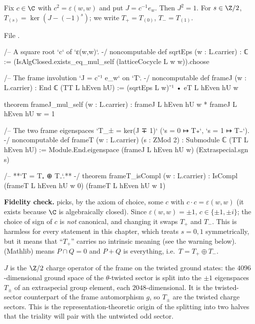 \begin{definition}\label{ch11:def:frameJ}
Fix $c\in\C$ with $c^2=\varepsilon(w,w)$ and put $J=c^{-1}e_w$.  Then $J^2=1$.  For $s\in\Z/2$,
$T_{(s)}=\ker(J-(-1)^s)$; we write $T_+=T_{(0)}$, $T_-=T_{(1)}$.
\end{definition}
\noindent File .
\begin{leancode}
/-- A square root `c` of `ε(w,w)`. -/
noncomputable def sqrtEps (w : L.carrier) : ℂ :=
  (IsAlgClosed.exists_eq_mul_self (latticeCocycle L w w)).choose

/-- The frame involution `J = c⁻¹ e_w` on `T`. -/
noncomputable def frameJ (w : L.carrier) : End ℂ (TT L hEven hU) :=
  (sqrtEps L w)⁻¹ • eT L hEven hU w

theorem frameJ_mul_self (w : L.carrier) : frameJ L hEven hU w * frameJ L hEven hU w = 1

/-- The two frame eigenspaces `T_± = ker(J ∓ 1)` (`s = 0 ↦ T₊`, `s = 1 ↦ T₋`). -/
noncomputable def frameT (w : L.carrier) (s : ZMod 2) : Submodule ℂ (TT L hEven hU) :=
  Module.End.eigenspace (frameJ L hEven hU w) (Extraspecial.sgn s)

/-- **`T = T₊ ⊕ T₋`.** -/
theorem frameT_isCompl (w : L.carrier) :
    IsCompl (frameT L hEven hU w 0) (frameT L hEven hU w 1)
\end{leancode}
\begin{dictionary}
\textbf{Fidelity check.}   picks, by the axiom of choice, some $c$ with $c\cdot c=
\varepsilon(w,w)$ (it exists because $\C$ is algebraically closed).  Since $\varepsilon(w,w)=\pm1$,
$c\in\{\pm1,\pm i\}$; the choice of sign of $c$ is \emph{not} canonical, and changing it swaps
$T_+$ and $T_-$.  This is harmless for every statement in this chapter, which treats $s=0,1$
symmetrically, but it means that ``$T_+$'' carries no intrinsic meaning (see the warning below).
 (Mathlib) means $P\cap Q=0$ and $P+Q$ is everything, i.e.\ $T=T_+\oplus T_-$.
\end{dictionary}

\begin{physics}
$J$ is the $\Z/2$ charge operator of the frame on the twisted ground states: the $4096$-dimensional ground space of the $\theta$-twisted sector is split into the $\pm1$ eigenspaces $T_\pm$ of an extraspecial group element, each $2048$-dimensional. It is the twisted-sector counterpart of the frame automorphism $g$, so $T_\pm$ are the twisted charge sectors. This is the representation-theoretic origin of the splitting into two halves that the triality will pair with the untwisted odd sector.
\end{physics}

